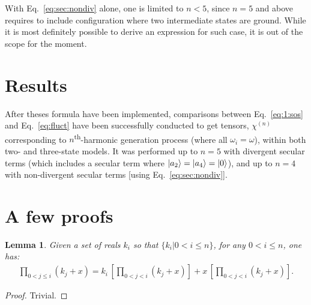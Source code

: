 \documentclass[12pt,a4paper]{article}
\begin{document}
With Eq.~\eqref{eq:sec:nondiv}  alone, one is limited to $n<5$, since $n=5$ and above requires to include configuration where two intermediate states are ground. While it is most definitely possible to derive an expression for such case, it is out of the scope for the moment.

\section{Results}

After theses formula have been implemented, comparisons between Eq.~\eqref{eq:1:sos} and Eq.~\eqref{eq:fluct} have been successfully conducted to get tensors, $\chi^{(n)}$ corresponding to $n$\textsuperscript{th}-harmonic generation process (where all $\omega_i = \omega$), within both two- and three-state models.
It was performed up to  $n = 5$ with divergent secular terms (which includes a secular term where $\ket{a_2} = \ket{a_4} = \ket{0}$), and up to $n=4$ with non-divergent secular terms [using Eq.~\eqref{eq:sec:nondiv}].


\clearpage
\appendix
\section{A few proofs}
\setcounter{equation}{0} 
\renewcommand{\theequation}{A\arabic{equation}}

\newtheorem{theorem}{Theorem}[section]
\newtheorem{lemma}[theorem]{Lemma}

\begin{lemma}\label{lem:1}
	Given a set of reals $k_i$ so that $\{k_i|0<i\leq n\}$,  for any $0<i\leq n$, one has:\begin{align}
		\prod_{0<j\leq i} (k_j+x)= k_{i}\,\left[\prod_{0<j<i} (k_j+x) \right] + x\,\left[\prod_{0<j<i} (k_j+x) \right].\label{eq:p1:ind}
	\end{align}
\end{lemma}
\begin{proof}
	Trivial.
\end{proof}
\end{document}
